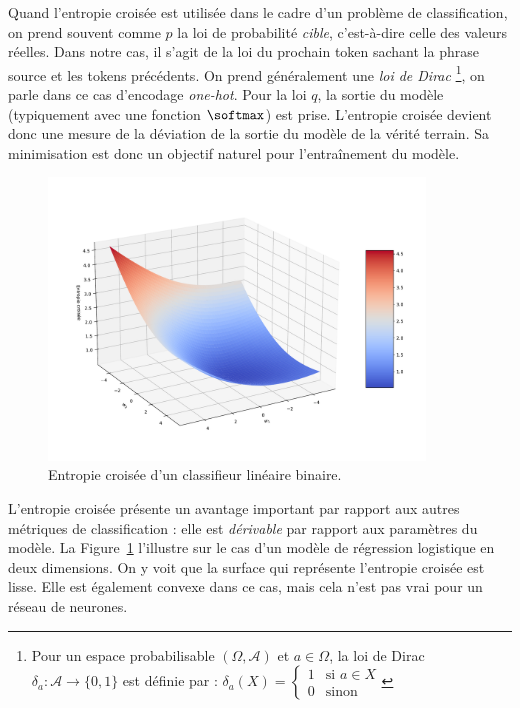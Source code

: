 Quand l'entropie croisée est utilisée dans le cadre d'un problème de classification,
on prend souvent comme \(p\) la loi de probabilité \emph{cible}, c'est-à-dire celle des valeurs réelles.
Dans notre cas, il s'agit de la loi du prochain token sachant la phrase source et les tokens précédents.
On prend généralement une \emph{loi de Dirac}%
\footnote{%
    Pour un espace probabilisable \((\Omega, \mathcal{A})\) et \(a\in\Omega\),
    la loi de Dirac \(\delta_a: \mathcal{A} \to \{0, 1\}\) est définie par :
    \(
        \delta_a(X) = 
        \begin{cases}
            1 & \text{si } a \in X \\
            0 & \text{sinon}
        \end{cases}    
    \)
}, on parle dans ce cas d'encodage \emph{\foreignlanguage{english}{one-hot}}.
Pour la loi \(q\), la sortie du modèle (typiquement avec une fonction \(\softmax\)) est prise.
L'entropie croisée devient donc une mesure de la déviation de la sortie du modèle de la vérité terrain.
Sa minimisation est donc un objectif naturel pour l'entraînement du modèle.

\begin{figure}[htb]
    \begin{center}
        \includegraphics[width=10cm]{assets/python/cross-entropy.pdf}
    \end{center}
    \caption{Entropie croisée d'un classifieur linéaire binaire.}
    \label{fig.cross-entropy}
\end{figure}

L'entropie croisée présente un avantage important par rapport aux autres métriques de classification :
elle est \emph{dérivable} par rapport aux paramètres du modèle.
La Figure~\ref{fig.cross-entropy} l'illustre sur le cas d'un modèle de régression logistique en deux dimensions.
On y voit que la surface qui représente l'entropie croisée est lisse.
Elle est également convexe dans ce cas, mais cela n'est pas vrai pour un réseau de neurones.

